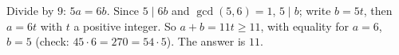 Divide by $9$: $5a=6b$. Since $5\mid6b$ and $\gcd(5,6)=1$, $5\mid b$; write $b=5t$, then $a=6t$ with $t$ a positive integer. So $a+b=11t\ge11$, with equality for $a=6$, $b=5$ (check: $45\cdot6=270=54\cdot5$). The answer is $\boxed{11}$.
